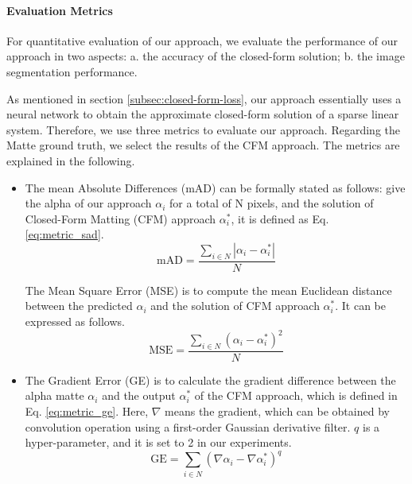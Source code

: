 \documentclass[journal]{IEEEtran}
\begin{document}
\paragraph{Evaluation Metrics}
For quantitative evaluation of our approach, we evaluate the performance of our approach in two aspects: a. the accuracy of the closed-form solution; b. the image segmentation performance. 

As mentioned in section \ref{subsec:closed-form-loss}, our approach essentially uses a neural network to obtain the approximate closed-form solution of a sparse linear system. Therefore, we use three metrics to evaluate our approach. Regarding the Matte ground truth, we select the results of the CFM approach. The metrics are explained in the following.
\begin{itemize}
    \item The mean Absolute Differences (mAD) can be formally stated as follows: give the alpha of our approach $\alpha_i$ for a total of N pixels, and the solution of Closed-Form Matting (CFM) approach $\alpha^*_i$, it is defined as Eq. \ref{eq:metric_sad}.
    \begin{equation}
        \text{mAD} = \frac{\sum\limits_{i\in N}|\alpha_i - \alpha^*_i |}{N}
        \label{eq:metric_sad}
    \end{equation}

    The Mean Square Error (MSE) is to compute the mean Euclidean distance between the predicted $\alpha_i$ and the solution of CFM approach $\alpha^*_i$. It can be expressed as follows. \\
    \begin{equation}
        \text{MSE} = \frac{\sum\limits_{i\in N} (\alpha_i - \alpha^*_i)^2}{N}
        \label{eq:metric_mse}
    \end{equation}
    \item The Gradient Error (GE) is to calculate the gradient difference between the alpha matte $\alpha_i$ and the output $\alpha^*_i$ of the CFM approach, which is defined in Eq. \ref{eq:metric_ge}. Here, $\nabla$ means the gradient, which can be obtained by convolution operation using a first-order Gaussian derivative filter. $q$ is a hyper-parameter, and it is set to 2 in our experiments.  
    \begin{equation}
      \text{GE} = \sum\limits_{i\in N} (\nabla \alpha_i - \nabla \alpha^*_i)^q
      \label{eq:metric_ge}
    \end{equation}
\end{itemize}
\end{document}
